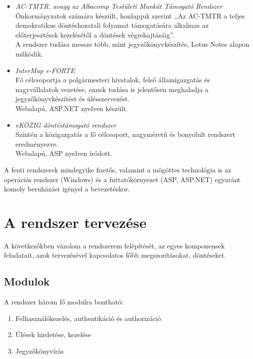\documentclass[a4paper,12pt,oneside]{report}
\begin{document}
\begin{itemize}

    \item \emph{AC-TMTR, avagy az Albacomp Testületi Munkát Támogató Rendszer}\cite{website:actmtr}\\
    Önkormányzatok számára készült, honlapjuk szerint ,,Az AC-TMTR a teljes demokratikus döntéshozatali folyamat támogatására alkalmas az előterjesztések kezelésétől a döntések végrehajtásáig''.\\
    A rendszer tudása messze több, mint jegyzőkönyvkészítés, Lotus Notes alapon működik.
    
    \item \emph{InterMap e-FORTE}\cite{website:eforte}\\
    Fő célcsoportja a polgármesteri hivatalok, felső államigazgatás és nagyvállalatok vezetése, ennek tudása is jelentősen meghaladja a jegyzőkönyvkészítést és ülésszervezést.\\
    Webalapú, ASP.NET nyelven készült.
    
    \item \emph{eKÖZIG döntéstámogató rendszer}\cite{website:ekozig}\\
    Szintén a közigazgatás a fő célcsoport, nagyméretű és bonyolult rendszert eredményezve.\\
    Webalapú, ASP nyelven íródott.
    
\end{itemize}

A fenti rendszerek mindegyike fizetős, valamint a mögöttes technológia is \textendash{} az operációs rendszer (Windows) és a futtatókörnyezet (ASP, ASP.NET) egyaránt komoly beruházást igényel a bevezetéskor.


\section{A rendszer tervezése}

A következőkben vázolom a rendszerem felépítését, az egyes komponensek feladatait, azok tervezésével kapcsolatos főbb megszorításokat, döntéseket.

\subsection{Modulok}

A rendszer három fő modulra bontható:

\begin{enumerate}
    \item Felhasználókezelés, authentikáció és authorizáció
    \item Ülések hirdetése, kezelése
    \item Jegyzőkönyvírás
\end{enumerate}
\end{document}

